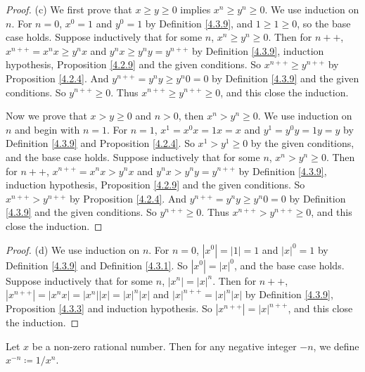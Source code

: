 \begin{proof}{(c)}
We first prove that \(x \geq y \geq 0\) implies \(x^n \geq y^n \geq 0\).
We use induction on \(n\).
For \(n = 0\), \(x^0 = 1\) and \(y^0 = 1\) by Definition \ref{4.3.9}, and \(1 \geq 1 \geq 0\), so the base case holds.
Suppose inductively that for some \(n\), \(x^n \geq y^n \geq 0\).
Then for \(n++\), \(x^{n++} = x^n x \geq y^n x\) and \(y^n x \geq y^n y = y^{n++}\) by Definition \ref{4.3.9}, induction hypothesis, Proposition \ref{4.2.9} and the given conditions.
So \(x^{n++} \geq y^{n++}\) by Proposition \ref{4.2.4}.
And \(y^{n++} = y^n y \geq y^n 0 = 0\) by Definition \ref{4.3.9} and the given conditions.
So \(y^{n++} \geq 0\).
Thus \(x^{n++} \geq y^{n++} \geq 0\), and this close the induction.

Now we prove that \(x > y \geq 0\) and \(n > 0\), then \(x^n > y^n \geq 0\).
We use induction on \(n\) and begin with \(n = 1\).
For \(n = 1\), \(x^1 = x^0 x = 1x = x\) and \(y^1 = y^0 y = 1y = y\) by Definition \ref{4.3.9} and Proposition \ref{4.2.4}.
So \(x^1 > y^1 \geq 0\) by the given conditions, and the base case holds.
Suppose inductively that for some \(n\), \(x^n > y^n \geq 0\).
Then for \(n++\), \(x^{n++} = x^n x > y^n x\) and \(y^n x > y^n y = y^{n++}\) by Definition \ref{4.3.9}, induction hypothesis, Proposition \ref{4.2.9} and the given conditions.
So \(x^{n++} > y^{n++}\) by Proposition \ref{4.2.4}.
And \(y^{n++} = y^n y \geq y^n 0 = 0\) by Definition \ref{4.3.9} and the given conditions.
So \(y^{n++} \geq 0\).
Thus \(x^{n++} > y^{n++} \geq 0\), and this close the induction.
\end{proof}

\begin{proof}{(d)}
We use induction on \(n\).
For \(n = 0\), \(|x^0| = |1| = 1\) and \(|x|^0 = 1\) by Definition \ref{4.3.9} and Definition \ref{4.3.1}.
So \(|x^0| = |x|^0\), and the base case holds.
Suppose inductively that for some \(n\), \(|x^n| = |x|^n\).
Then for \(n++\), \(|x^{n++}| = |x^n x| = |x^n||x| = |x|^n |x|\) and \(|x|^{n++} = |x|^n |x|\) by Definition \ref{4.3.9}, Proposition \ref{4.3.3} and induction hypothesis.
So \(|x^{n++}| = |x|^{n++}\), and this close the induction.
\end{proof}

\begin{definition}\label{4.3.11}
Let \(x\) be a non-zero rational number.
Then for any negative integer \(-n\), we define \(x^{-n} \coloneqq 1 / x^n\).
\end{definition}

